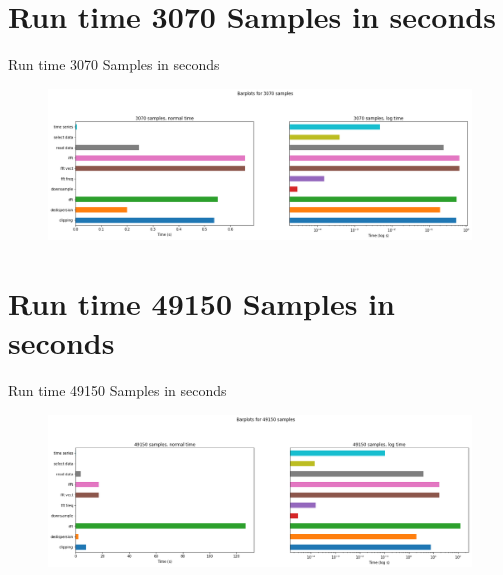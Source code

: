 \documentclass{beamer}
\begin{document}
\section{Run time 3070 Samples in seconds}
\begin{frame}{Run time 3070 Samples in seconds}
	\begin{figure}
		\includegraphics[width=\textwidth]{barchart_3070}
	\end{figure}
\end{frame}

\section{Run time 49150 Samples in seconds}
\begin{frame}{Run time 49150 Samples in seconds}
	\begin{figure}
		\includegraphics[width=\textwidth]{barchart_49150}
	\end{figure}
\end{frame}
\end{document}
